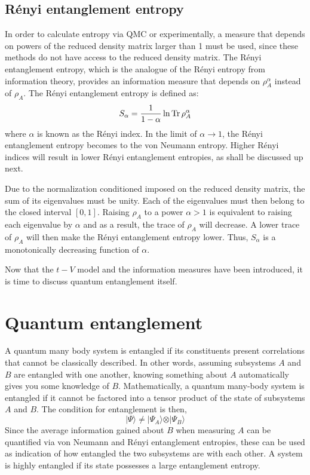 	\subsection{R\'enyi entanglement entropy}
	
	In order to calculate entropy via QMC or experimentally, a measure that depends on powers of the reduced density matrix larger than 1 must be used, since these methods do not have access to the reduced density matrix. The R\'enyi entanglement entropy, which is the analogue of the R\'enyi entropy from information theory, provides an information measure that depends on $\rho_{A}^{\alpha}$ instead of $\rho_{A}$. The R\'enyi entanglement entropy is defined as:
	\begin{equation}
	\label{eq: renyiEE}
	S_{\alpha} = \frac{1}{1-\alpha} \ln \operatorname{Tr} \rho_{A}^{\alpha}
	\end{equation}
	where $\alpha$ is known as the R\'enyi index. In the limit of $\alpha \to 1$, the R\'enyi entanglement entropy becomes to the von Neumann entropy. Higher R\'enyi indices will result in lower R\'enyi entanglement entropies, as shall be discussed up next.
	
	Due to the normalization conditioned imposed on the reduced density matrix, the sum of its eigenvalues must be unity. Each of the eigenvalues must then belong to the closed interval $\left [ 0,1 \right ]$. Raising $\rho_A$ to a power $\alpha > 1$ is equivalent to raising each eigenvalue by $\alpha$ and as a result, the trace of $\rho_A$ will decrease. A lower trace of $\rho_A$ will then make the R\'enyi entanglement entropy lower. Thus, $S_{\alpha}$ is a monotonically decreasing function of $\alpha$. 
	
	Now that the $t-V$ model and the information measures have been introduced, it is time to discuss quantum entanglement itself.
	
\section{Quantum entanglement}
\label{sec:quantumEntanglement}

	A quantum many body system is entangled if its constituents present correlations that cannot be classically described. In other words, assuming subsystems $A$ and $B$ are entangled with one another, knowing something about $A$ automatically gives you some knowledge of $B$. 	Mathematically, a quantum many-body system is entangled if it cannot be factored into a tensor product of the state of subsystems $A$ and $B$. The condition for entanglement is then,
%	
	\begin{equation}
	\vert\Psi\rangle \neq \vert\Psi_{A}\rangle \otimes \vert\Psi_{B}\rangle
	\label{eq:entanglementCondition}
	\end{equation}
%
	Since the average information gained about $B$ when measuring $A$ can be quantified via von Neumann and R\'enyi entanglement entropies, these can be used as indication of how entangled the two subsystems are with each other. A system is highly entangled if its state possesses a large entanglement entropy.
	
